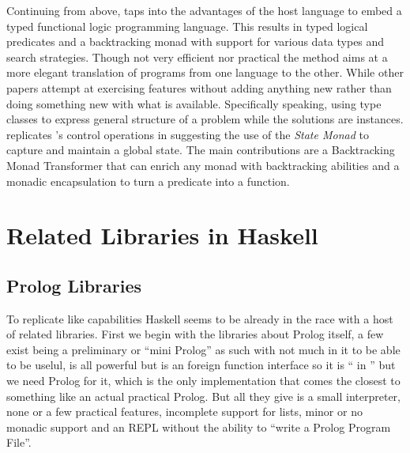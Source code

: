 \documentclass[thesis-solanki.tex]{subfiles}
\begin{document}
  Continuing from above, \cite{claessen2000typed} taps into the advantages of the host language to embed a typed
  functional logic programming language.
  This results in typed logical predicates and a backtracking monad with support for various data types and search
  strategies.
  Though not very efficient nor practical the method aims at a more elegant translation of programs from one
  language to the other.
  While other papers \cite{erwig2004escape} attempt at exercising  features without adding
  anything new rather than doing something new with what is available.
  Specifically speaking, using  type classes to express general structure of a problem while the
  solutions are instances.
  \cite{hinze1998prological} replicates 's control operations in  suggesting the
  use of the  \textit{State Monad} to capture and maintain a global state.
  The main contributions are a Backtracking Monad Transformer that can enrich any monad with backtracking abilities
  and a monadic encapsulation to turn a  predicate into a  function.



\section{Related Libraries in Haskell}
\subsection{Prolog Libraries}

  To replicate  like
  capabilities Haskell seems to be already in the race
  with a host of related libraries.
  First we begin with the libraries about Prolog itself, a few exist \cite{nanoprolog-lib} being a preliminary or
  ``mini Prolog'' as such with not much in it to be able to be uselul, \cite{hswip-lib} is all
  powerful but is an foreign function interface so it is `` in '' but we need Prolog
  for it, \cite{prolog-lib} which is the only implementation that comes the closest to something like an actual
  practical Prolog.
  But all they give is a small interpreter, none or a few practical features, incomplete support for lists, minor
  or no monadic support and an REPL without the ability to ``write a Prolog Program File''.
\end{document}
